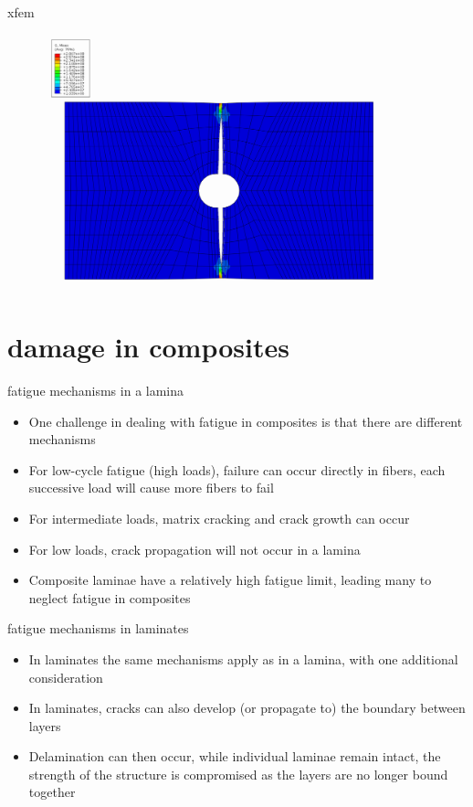 \documentclass[10pt]{beamer}
\begin{document}
	\begin{frame}{xfem}
		\begin{figure}
			\centering
			\includegraphics[width=0.9\linewidth]{../Figures/xfem9}
		\end{figure}
	\end{frame}
	
	\section{damage in composites}
	
	\begin{frame}{fatigue mechanisms in a lamina}
		\begin{itemize}[<+->]
			\item One challenge in dealing with fatigue  in composites is that there are different mechanisms
			\item For low-cycle fatigue (high loads), failure can occur directly in fibers, each successive load will cause more fibers to fail
			\item For intermediate loads, matrix cracking and crack growth can occur
			\item For low loads, crack propagation will not occur in a lamina 
			\item Composite laminae have a relatively high fatigue limit, leading many to neglect fatigue in composites
		\end{itemize}
	\end{frame}
	
	\begin{frame}{fatigue mechanisms in laminates}
		\begin{itemize}[<+->]
			\item In laminates the same mechanisms apply as in a lamina, with one additional consideration
			\item In laminates, cracks can also develop (or propagate to) the boundary between layers
			\item Delamination can then occur, while individual laminae remain intact, the strength of the structure is compromised as the layers are no longer bound together
		\end{itemize}
	\end{frame}
	
\end{document}
